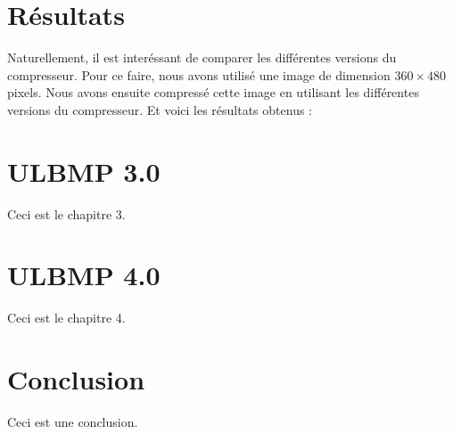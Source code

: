 \documentclass[utf8]{article}
\begin{document}
\section{Résultats}
Naturellement, il est interéssant de comparer les différentes versions du compresseur. Pour ce faire, nous avons utilisé une image de dimension $360 \times 480$ pixels. Nous avons ensuite compressé cette image en utilisant les différentes versions du compresseur. Et voici les résultats obtenus : 







\section{ULBMP 3.0}
Ceci est le chapitre 3.

\section{ULBMP 4.0}
Ceci est le chapitre 4.

\section{Conclusion}
Ceci est une conclusion.
\end{document}
